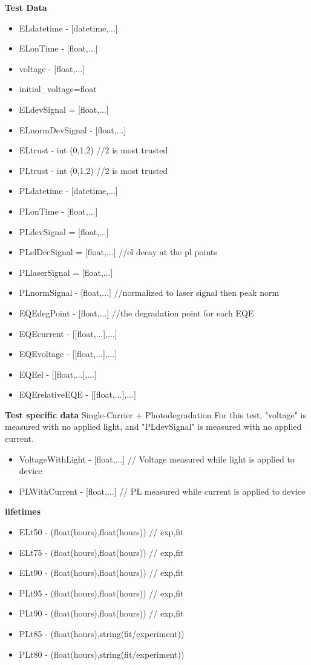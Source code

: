 \documentclass[../thesis.tex]{subfiles}
\begin{document}
\textbf{Test Data}
\begin{itemize}
\item ELdatetime - [datetime,...]
\item ELonTime - [float,...]
\item voltage - [float,...]
\item initial\_voltage=float
\item ELdevSignal = [float,...]
\item ELnormDevSignal - [float,...]
\item ELtrust - int (0,1,2) //2 is most trusted
\item PLtrust - int (0,1,2) //2 is most trusted
\item PLdatetime - [datetime,...]
\item PLonTime - [float,...]
\item PLdevSignal = [float,...]
\item PLelDecSignal = [float,...] //el decay at the pl points
\item PLlaserSignal = [float,...]
\item PLnormSignal - [float,...] //normalized to laser signal then peak norm
\item EQEdegPoint - [float,...] //the degradation point for each EQE
\item EQEcurrent - [[float,...],...]
\item EQEvoltage - [[float,...],...]
\item EQEel - [[float,...],...]
\item EQErelativeEQE - [[float,...],...]
\end{itemize}

\textbf{Test specific data}
Single-Carrier + Photodegradation
For this test, "voltage" is measured with no applied light, and "PLdevSignal" is measured with no applied current.
\begin{itemize}
\item VoltageWithLight - [float,...] // Voltage measured while light is applied to device

\item PLWithCurrent - [float,...] // PL measured while current is applied to device

\end{itemize}

\textbf{lifetimes}
\begin{itemize}
\item ELt50 - (float(hours),float(hours)) // exp,fit
\item ELt75 - (float(hours),float(hours)) // exp,fit
\item ELt90 - (float(hours),float(hours)) // exp,fit
\item PLt95 - (float(hours),float(hours)) // exp,fit
\item PLt90 - (float(hours),float(hours)) // exp,fit
\item PLt85 - (float(hours),string(fit/experiment))
\item PLt80 - (float(hours),string(fit/experiment))
\end{itemize}
\end{document}
